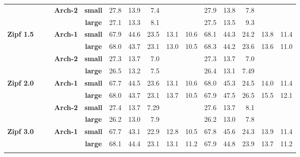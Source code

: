 \documentclass[10pt, conference, compsocconf]{IEEEtran}
\begin{document}
\begin{table}[htbp]
{\begin{tabular}{ccccc||rrrrr|rrrrr}
			&&&\multirow{2}{*}{\textbf{Arch-2}} & \textbf{small}  & 27.8    & 13.9   & 7.4   &        &       &  27.9    &  13.8   & 7.8   &        &       \\
			&&&& \textbf{large} &  27.1      &   13.3     &       8.1 &        &       &     27.5    &     13.5    &     9.3   &        &   \\ \hline  
			
				\multicolumn{1}{l}{\multirow{4}{*}{\textbf{Zipf 1.5}}}
			&&&\multirow{2}{*}{\textbf{Arch-1}} & \textbf{small}  & 67.9    & 44.6   & 23.5   & 13.1   & 10.6   & 68.1    & 44.3    & 24.2   & 13.8   & 11.4   \\
			&&&& \textbf{large} & 68.0    & 43.7   & 23.1   &   13.0 & 10.5   &  68.3 &	44.2 &	23.6	& 13.6	& 11.0 \\ \cline{2-15}
			
			&&&\multirow{2}{*}{\textbf{Arch-2}} & \textbf{small}  & 27.3    & 13.7   & 7.0   &        &       &  27.3    &  13.7   & 7.0   &        &       \\
			&&&& \textbf{large} &  26.5      &   13.2     &       7.5 &        &       &     26.4    &     13.1    &     7.49   &        &   \\ \hline  
			
				\multicolumn{1}{l}{\multirow{4}{*}{\textbf{Zipf 2.0}}}
			&&&\multirow{2}{*}{\textbf{Arch-1}} & \textbf{small}  & 67.7    & 44.5   & 23.6   & 13.1   & 10.6   & 68.0    & 45.3    & 24.5   & 14.0   & 11.4   \\
			&&&& \textbf{large} & 68.0    & 43.7   & 23.1   &   13.7 & 10.5   &  67.9 &	47.5 &	26.5	& 15.5	& 12.1 \\ \cline{2-15}
			
			&&&\multirow{2}{*}{\textbf{Arch-2}} & \textbf{small}  & 27.4    & 13.7   & 7.29   &        &       &  27.6    &  13.7   & 8.1   &        &       \\
			&&&& \textbf{large} &  26.2      &   13.0     &       7.9 &        &       &     26.2    &     13.0    &     7.8   &        &   \\ \hline 

				\multicolumn{1}{l}{\multirow{4}{*}{\textbf{Zipf 3.0}}}
			&&&\multirow{2}{*}{\textbf{Arch-1}} & \textbf{small}  & 67.7    & 43.1   & 22.9  & 12.8   & 10.5   & 67.8    & 45.6    & 24.3   & 13.9   & 11.4   \\
			&&&& \textbf{large} & 68.1    & 44.4   & 23.1   &   13.1 & 11.2   &  67.9 &	44.8 &	23.9	& 13.7	& 11.2 \\ \cline{2-15}
			

\end{tabular}}
\end{table}
\end{document}
